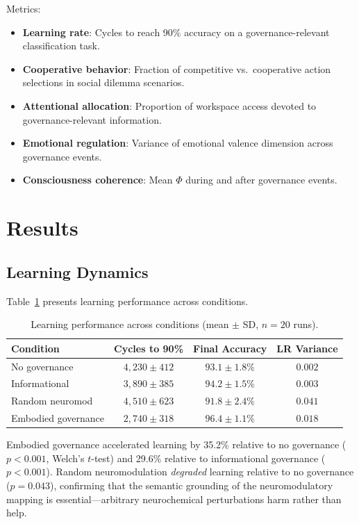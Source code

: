 \documentclass[11pt,a4paper]{article}
\begin{document}
Metrics:
\begin{itemize}
  \item \textbf{Learning rate}: Cycles to reach 90\% accuracy on a governance-relevant classification task.
  \item \textbf{Cooperative behavior}: Fraction of competitive vs.\ cooperative action selections in social dilemma scenarios.
  \item \textbf{Attentional allocation}: Proportion of workspace access devoted to governance-relevant information.
  \item \textbf{Emotional regulation}: Variance of emotional valence dimension across governance events.
  \item \textbf{Consciousness coherence}: Mean $\Phi$ during and after governance events.
\end{itemize}

\section{Results}
\label{sec:results}

\subsection{Learning Dynamics}

Table~\ref{tab:learning} presents learning performance across conditions.

\begin{table}[h]
\centering
\caption{Learning performance across conditions (mean $\pm$ SD, $n = 20$ runs).}
\label{tab:learning}
\begin{tabular}{lccc}
\toprule
\textbf{Condition} & \textbf{Cycles to 90\%} & \textbf{Final Accuracy} & \textbf{LR Variance} \\
\midrule
No governance        & $4,230 \pm 412$ & $93.1 \pm 1.8\%$ & $0.002$ \\
Informational        & $3,890 \pm 385$ & $94.2 \pm 1.5\%$ & $0.003$ \\
Random neuromod      & $4,510 \pm 623$ & $91.8 \pm 2.4\%$ & $0.041$ \\
Embodied governance  & $2,740 \pm 318$ & $96.4 \pm 1.1\%$ & $0.018$ \\
\bottomrule
\end{tabular}
\end{table}

Embodied governance accelerated learning by 35.2\% relative to no governance ($p < 0.001$, Welch's $t$-test) and 29.6\% relative to informational governance ($p < 0.001$).
Random neuromodulation \emph{degraded} learning relative to no governance ($p = 0.043$), confirming that the semantic grounding of the neuromodulatory mapping is essential---arbitrary neurochemical perturbations harm rather than help.
\end{document}
